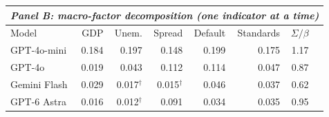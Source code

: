 \begin{table}[t]
\begin{tabular}{lrrrrrrr}
\midrule
\multicolumn{8}{l}{\emph{Panel B: macro-factor decomposition (one indicator at a time)}}\\
\midrule
Model & GDP & Unem. & Spread & Default & Standards & $\Sigma/\beta$ & \\
\midrule
GPT-4o-mini & 0.184 & 0.197 & 0.148 & 0.199 & 0.175 & 1.17 &  \\
GPT-4o & 0.019 & 0.043 & 0.112 & 0.114 & 0.047 & 0.87 &  \\
Gemini Flash & 0.029 & 0.017$^{\dagger}$ & 0.015$^{\dagger}$ & 0.046 & 0.037 & 0.62 &  \\
GPT-6 Astra & 0.016 & 0.012$^{\dagger}$ & 0.091 & 0.034 & 0.035 & 0.95 &  \\
\bottomrule
\end{tabular}\end{table}
